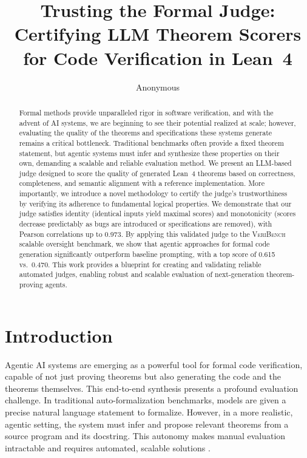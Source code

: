 \documentclass{article}
\title{Trusting the Formal Judge: Certifying LLM Theorem Scorers for Code Verification in Lean~4}
\author{Anonymous}
\begin{document}
\ifcolmsubmission
\linenumbers
\fi

\maketitle

\begin{abstract}
Formal methods provide unparalleled rigor in software verification, and with the advent of AI systems, we are beginning to see their potential realized at scale; however, evaluating the quality of the theorems and specifications these systems generate remains a critical bottleneck.
Traditional benchmarks often provide a fixed theorem statement, but agentic systems must infer and synthesize these properties on their own, demanding a scalable and reliable evaluation method.
We present an LLM-based judge designed to score the quality of generated Lean~4 theorems based on correctness, completeness, and semantic alignment with a reference implementation.
More importantly, we introduce a novel methodology to certify the judge's trustworthiness by verifying its adherence to fundamental logical properties.
We demonstrate that our judge satisfies identity (identical inputs yield maximal scores) and monotonicity (scores decrease predictably as bugs are introduced or specifications are removed), with Pearson correlations up to 0.973.
By applying this validated judge to the \textsc{VeriBench}\citep{veribench_icml25} scalable oversight benchmark, we show that agentic approaches for formal code generation significantly outperform baseline prompting, with a top score of 0.615 vs.\ 0.470.
This work provides a blueprint for creating and validating reliable automated judges, enabling robust and scalable evaluation of next-generation theorem-proving agents.
\end{abstract}

\section{Introduction}

Agentic AI systems are emerging as a powerful tool for formal code verification, capable of not just proving theorems but also generating the code and the theorems themselves. This end-to-end synthesis presents a profound evaluation challenge. In traditional auto-formalization benchmarks, models are given a precise natural language statement to formalize. However, in a more realistic, agentic setting, the system must infer and propose relevant theorems from a source program and its docstring. This autonomy makes manual evaluation intractable and requires automated, scalable solutions \citep{zhou2025graders,khattab2024dspy,cheng2024trace}.
\end{document}
